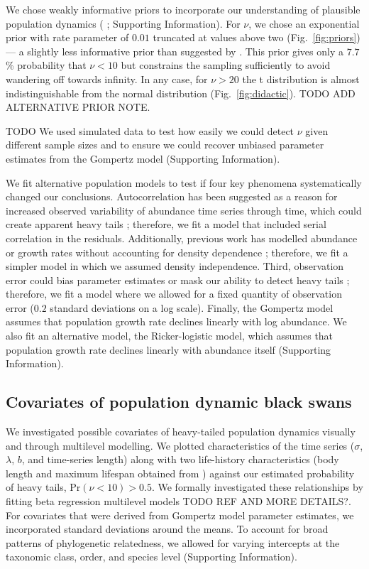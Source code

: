 We chose weakly informative priors to incorporate our understanding of plausible population dynamics (\citeauthor{gelman2014} \citeyear{gelman2014}; Supporting Information). For $\nu$, we chose an exponential prior with rate parameter of $0.01$ truncated at values above two (Fig.~\ref{fig:priors}) --- a slightly less informative prior than suggested by \citet{fernandez1998}. This prior gives only a $7.7$\% probability that $\nu < 10$ but constrains the sampling sufficiently to avoid wandering off towards infinity. In any case,  for $\nu > 20$ the t distribution is almost indistinguishable from the normal distribution (Fig.~\ref{fig:didactic}). TODO ADD ALTERNATIVE PRIOR NOTE.

TODO We used simulated data to test how easily we could detect $\nu$ given different sample sizes and to ensure we could recover unbiased parameter estimates from the Gompertz model (Supporting Information).

We fit alternative population models to test if four key phenomena systematically changed our conclusions. Autocorrelation has been suggested as a reason for increased observed variability of abundance time series through time, which could create apparent heavy tails \citep{inchausti2002}; therefore, we fit a model that included serial correlation in the residuals. Additionally, previous work has modelled abundance or growth rates without accounting for density dependence \citep{halley2002,segura2013}; therefore, we fit a simpler model in which we assumed density independence. Third, observation error could bias parameter estimates \citep{knape2012} or mask our ability to detect heavy tails \citep{ward2007}; therefore, we fit a model where we allowed for a fixed quantity of observation error ($0.2$ standard deviations on a log scale). Finally, the Gompertz model assumes that population growth rate declines linearly with log abundance. We also fit an alternative model, the Ricker-logistic model, which assumes that population growth rate declines linearly with abundance itself (Supporting Information).

\subsection{Covariates of population dynamic black swans}

We investigated possible covariates of heavy-tailed population dynamics visually and through multilevel modelling. We plotted characteristics of the time series ($\sigma$, $\lambda$, $b$, and time-series length) along with two life-history characteristics (body length and maximum lifespan obtained from \citet{brook2006a}) against our estimated probability of heavy tails, Pr$(\nu < 10) > 0.5$. We formally investigated these relationships by fitting beta regression multilevel models TODO REF AND MORE DETAILS?. For covariates that were derived from Gompertz model parameter estimates, we incorporated standard deviations around the means. To account for broad patterns of phylogenetic relatedness, we allowed for varying intercepts at the taxonomic class, order, and species level (Supporting Information).

